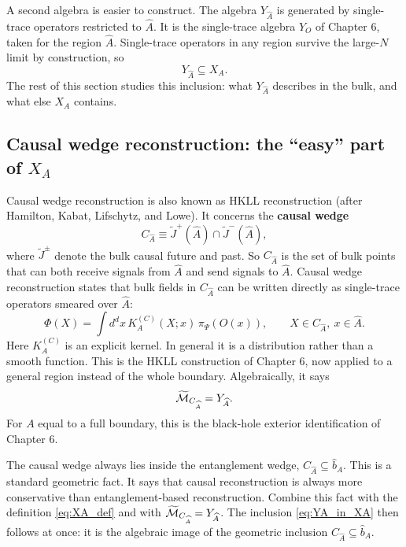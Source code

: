 A second algebra is easier to construct. The algebra $Y_{\widehat A}$ is generated by single-trace operators
restricted to $\widehat A$. It is the single-trace algebra $Y_O$ of Chapter 6, taken for the region
$\widehat A$. Single-trace operators in any region survive the large-$N$ limit by construction, so
\begin{equation}
Y_{\widehat A} \subseteq X_A .
\label{eq:YA_in_XA}
\end{equation}
The rest of this section studies this inclusion: what $Y_{\widehat A}$ describes in the bulk, and what else
$X_A$ contains.

\subsection*{Causal wedge reconstruction: the ``easy'' part of $X_A$}

Causal wedge reconstruction is also known as HKLL reconstruction (after Hamilton, Kabat, Lifschytz, and
Lowe). It concerns the \textbf{causal wedge}
\[
C_{\widehat A}\equiv \widetilde J^+(\widehat A)\cap\widetilde J^-(\widehat A) ,
\]
where $\widetilde J^\pm$ denote the bulk causal future and past. So $C_{\widehat A}$ is the set of bulk points
that can both receive signals from $\widehat A$ and send signals to $\widehat A$. Causal wedge reconstruction
states that bulk fields in $C_{\widehat A}$ can be written directly as single-trace operators smeared over
$\widehat A$:
\begin{equation}
\Phi(X) = \int d^dx\,K_A^{(C)}(X;x)\,\pi_\Psi(O(x)), \qquad X\in C_{\widehat A},\ x\in\widehat A .
\label{eq:HKLL_region}
\end{equation}
Here $K_A^{(C)}$ is an explicit kernel. In general it is a distribution rather than a smooth function. This
is the HKLL construction of Chapter 6, now applied to a general region instead of the whole boundary.
Algebraically, it says
\[
\widetilde{\mathcal{M}}_{C_{\widehat A}} = Y_{\widehat A} .
\]
For $A$ equal to a full boundary, this is the black-hole exterior identification of Chapter 6.

The causal wedge always lies inside the entanglement wedge, $C_{\widehat A}\subseteq\widehat b_A$. This is a
standard geometric fact. It says that causal reconstruction is always more conservative than
entanglement-based reconstruction. Combine this fact with the definition \eqref{eq:XA_def} and with
$\widetilde{\mathcal{M}}_{C_{\widehat A}}=Y_{\widehat A}$. The inclusion \eqref{eq:YA_in_XA} then follows at once: it is
the algebraic image of the geometric inclusion $C_{\widehat A}\subseteq\widehat b_A$.

